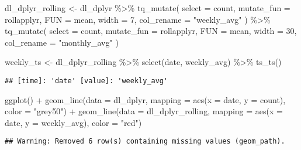 \documentclass[
]{book}
\newenvironment{Shaded}{\begin{snugshade}}{\end{snugshade}}
\newcommand{\AttributeTok}[1]{\textcolor[rgb]{0.77,0.63,0.00}{#1}}
\newcommand{\DecValTok}[1]{\textcolor[rgb]{0.00,0.00,0.81}{#1}}
\newcommand{\FunctionTok}[1]{\textcolor[rgb]{0.00,0.00,0.00}{#1}}
\newcommand{\NormalTok}[1]{#1}
\newcommand{\OtherTok}[1]{\textcolor[rgb]{0.56,0.35,0.01}{#1}}
\newcommand{\SpecialCharTok}[1]{\textcolor[rgb]{0.00,0.00,0.00}{#1}}
\newcommand{\StringTok}[1]{\textcolor[rgb]{0.31,0.60,0.02}{#1}}
\begin{document}
\begin{Shaded}
\begin{Highlighting}[]
\NormalTok{dl\_dplyr\_rolling }\OtherTok{\textless{}{-}}\NormalTok{ dl\_dplyr }\SpecialCharTok{\%\textgreater{}\%}
  \FunctionTok{tq\_mutate}\NormalTok{(}
    \AttributeTok{select =}\NormalTok{ count,}
    \AttributeTok{mutate\_fun =}\NormalTok{ rollapplyr,}
    \AttributeTok{FUN =}\NormalTok{ mean,}
    \AttributeTok{width =} \DecValTok{7}\NormalTok{,}
    \AttributeTok{col\_rename =} \StringTok{"weekly\_avg"}
\NormalTok{  ) }\SpecialCharTok{\%\textgreater{}\%}
  \FunctionTok{tq\_mutate}\NormalTok{(}
    \AttributeTok{select =}\NormalTok{ count,}
    \AttributeTok{mutate\_fun =}\NormalTok{ rollapplyr,}
    \AttributeTok{FUN =}\NormalTok{ mean,}
    \AttributeTok{width =} \DecValTok{30}\NormalTok{,}
    \AttributeTok{col\_rename =} \StringTok{"monthly\_avg"}
\NormalTok{  )}

\NormalTok{weekly\_ts }\OtherTok{\textless{}{-}}\NormalTok{ dl\_dplyr\_rolling }\SpecialCharTok{\%\textgreater{}\%}
  \FunctionTok{select}\NormalTok{(date, weekly\_avg) }\SpecialCharTok{\%\textgreater{}\%}
  \FunctionTok{ts\_ts}\NormalTok{()}
\end{Highlighting}
\end{Shaded}

\begin{verbatim}
## [time]: 'date' [value]: 'weekly_avg'
\end{verbatim}

\begin{Shaded}
\begin{Highlighting}[]
\FunctionTok{ggplot}\NormalTok{() }\SpecialCharTok{+}
  \FunctionTok{geom\_line}\NormalTok{(}\AttributeTok{data =}\NormalTok{ dl\_dplyr, }\AttributeTok{mapping =} \FunctionTok{aes}\NormalTok{(}\AttributeTok{x =}\NormalTok{ date, }\AttributeTok{y =}\NormalTok{ count), }\AttributeTok{color =} \StringTok{"grey50"}\NormalTok{) }\SpecialCharTok{+}
  \FunctionTok{geom\_line}\NormalTok{(}\AttributeTok{data =}\NormalTok{ dl\_dplyr\_rolling, }\AttributeTok{mapping =} \FunctionTok{aes}\NormalTok{(}\AttributeTok{x =}\NormalTok{ date, }\AttributeTok{y =}\NormalTok{ weekly\_avg), }\AttributeTok{color =} \StringTok{"red"}\NormalTok{)}
\end{Highlighting}
\end{Shaded}

\begin{verbatim}
## Warning: Removed 6 row(s) containing missing values (geom_path).
\end{verbatim}
\end{document}
